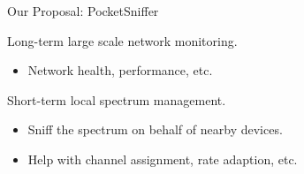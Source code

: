\begin{frame}{Our Proposal: PocketSniffer}
  \begin{figure}
    \centering
  \end{figure}
  Long-term large scale network monitoring.
  \begin{itemize}
    \item Network health, performance, etc.
  \end{itemize}
  Short-term local spectrum management.
  \begin{itemize}
    \item Sniff the spectrum on behalf of nearby devices.
    \item Help with channel assignment, rate adaption, etc.
  \end{itemize}
\end{frame}
